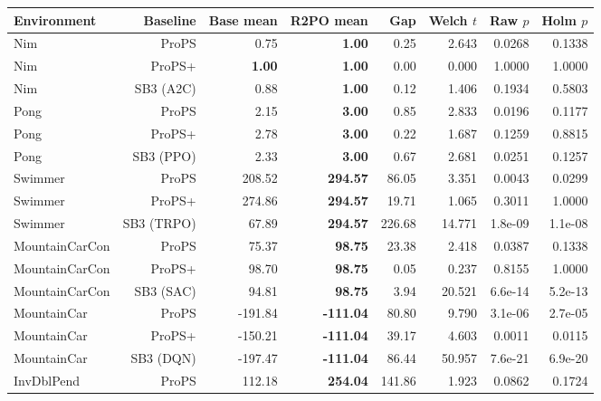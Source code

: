 \begin{tabular}{@{}lrrrrrrr@{}}
\toprule
Environment & Baseline & Base mean & R2PO mean & Gap & Welch $t$ & Raw $p$ & Holm $p$ \\
\midrule
Nim & ProPS & 0.75 & \cellcolor{bestcolor}\textbf{1.00} & 0.25 & 2.643 & 0.0268 & 0.1338 \\
Nim & ProPS+ & \cellcolor{bestcolor}\textbf{1.00} & \cellcolor{bestcolor}\textbf{1.00} & 0.00 & 0.000 & 1.0000 & 1.0000 \\
Nim & SB3 (A2C) & 0.88 & \cellcolor{bestcolor}\textbf{1.00} & 0.12 & 1.406 & 0.1934 & 0.5803 \\
Pong & ProPS & 2.15 & \cellcolor{bestcolor}\textbf{3.00} & 0.85 & 2.833 & 0.0196 & 0.1177 \\
Pong & ProPS+ & 2.78 & \cellcolor{bestcolor}\textbf{3.00} & 0.22 & 1.687 & 0.1259 & 0.8815 \\
Pong & SB3 (PPO) & 2.33 & \cellcolor{bestcolor}\textbf{3.00} & 0.67 & 2.681 & 0.0251 & 0.1257 \\
Swimmer & ProPS & 208.52 & \cellcolor{bestcolor}\textbf{294.57} & 86.05 & 3.351 & 0.0043 & 0.0299 \\
Swimmer & ProPS+ & 274.86 & \cellcolor{bestcolor}\textbf{294.57} & 19.71 & 1.065 & 0.3011 & 1.0000 \\
Swimmer & SB3 (TRPO) & 67.89 & \cellcolor{bestcolor}\textbf{294.57} & 226.68 & 14.771 & 1.8e-09 & 1.1e-08 \\
MountainCarCon & ProPS & 75.37 & \cellcolor{bestcolor}\textbf{98.75} & 23.38 & 2.418 & 0.0387 & 0.1338 \\
MountainCarCon & ProPS+ & 98.70 & \cellcolor{bestcolor}\textbf{98.75} & 0.05 & 0.237 & 0.8155 & 1.0000 \\
MountainCarCon & SB3 (SAC) & 94.81 & \cellcolor{bestcolor}\textbf{98.75} & 3.94 & 20.521 & 6.6e-14 & 5.2e-13 \\
MountainCar & ProPS & -191.84 & \cellcolor{bestcolor}\textbf{-111.04} & 80.80 & 9.790 & 3.1e-06 & 2.7e-05 \\
MountainCar & ProPS+ & -150.21 & \cellcolor{bestcolor}\textbf{-111.04} & 39.17 & 4.603 & 0.0011 & 0.0115 \\
MountainCar & SB3 (DQN) & -197.47 & \cellcolor{bestcolor}\textbf{-111.04} & 86.44 & 50.957 & 7.6e-21 & 6.9e-20 \\
InvDblPend & ProPS & 112.18 & \cellcolor{bestcolor}\textbf{254.04} & 141.86 & 1.923 & 0.0862 & 0.1724 \\

\end{tabular}
